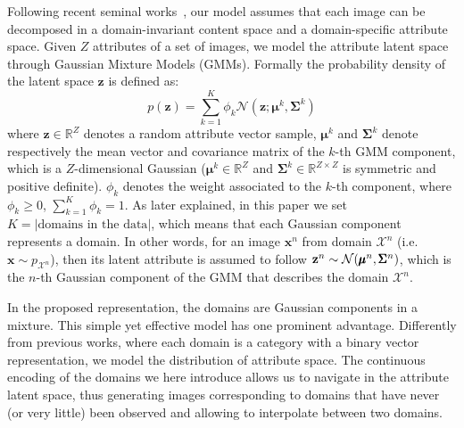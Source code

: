 \documentclass[runningheads]{llncs}
\begin{document}
Following recent seminal works~\cite{huang2018multimodal,lee2018diverse}, our model assumes that each image can be decomposed in a domain-invariant content space and a domain-specific attribute space. 
Given $Z$ attributes of a set of images, we model the attribute latent space through Gaussian Mixture Models (GMMs). Formally the probability density of the latent space $\mathbf{z}$ is defined as:
\begin{equation}
    p(\mathbf{z}) = \textstyle \sum_{k=1}^{K}\phi_k\mathcal{N}(\mathbf{z}; \pmb{\mu}^k, \pmb{\Sigma}^k)
    \label{eq:gmm}
\end{equation}
where $\mathbf{z}\in\mathbb{R}^Z$ denotes a random attribute vector sample, $\pmb{\mu}^k$ and $\pmb{\Sigma}^k$ denote respectively the mean vector and covariance matrix of the $k$-th GMM component, which is a $Z$-dimensional Gaussian ($\pmb{\mu}^k\in\mathbb{R}^Z$ and $\pmb{\Sigma}^k\in\mathbb{R}^{Z\times Z}$ is symmetric and positive definite). 
$\phi_k$ denotes the weight associated to the $k$-th component, where $\phi_k\geq 0$, $\sum_{k=1}^K \phi_k = 1$.
As later explained, in this paper we set $K=\left|\text{domains in the data}\right|$, which means that each Gaussian component represents a domain.
In other words, for an image $\mathbf{x}^n$ from domain $\pmb{\mathcal{X}}^n$ (i.e. $\mathbf{x} \sim p_{\pmb{\mathcal{X}}^n}$), then its latent attribute is assumed to follow $\mathbf{z}^n\sim{\cal N}(\pmb{\mu}^n, \pmb{\Sigma}^n)$, which is the $n$-th Gaussian component of the GMM that describes the domain $\pmb{\mathcal{X}}^n$. 

In the proposed representation, the domains are Gaussian components in a mixture. This simple yet effective model has one prominent advantage. Differently from previous works, where each domain is a category with a binary vector representation, we model the  distribution of attribute space.
The continuous encoding of the domains we here introduce allows us to navigate in the attribute latent space, thus generating images corresponding to domains that have never (or very little) been observed and allowing to interpolate between two domains.
\end{document}
